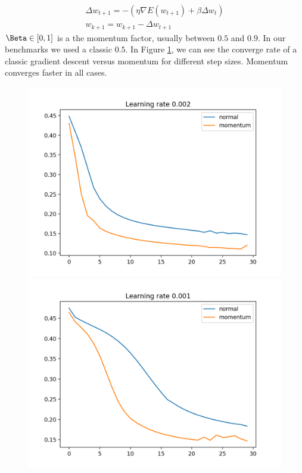 \documentclass[11pt]{article}
\begin{document}
\begin{equation}
	\label{eq: momentum}
	\begin{split}
	\Delta w_{ t + 1} = - (\eta \nabla E(w_{t + 1}) + \beta \Delta w_t) \\
	 w_{k + 1} = w_{k + 1} -   \Delta w_{ t + 1}
	 \end{split}
\end{equation}
$\Beta \in [0,1]$ is a the momentum factor, usually between $0.5$ and $0.9$. In our benchmarks we used a classic $0.5$. In Figure \ref{fig:momentum}, we can see the converge rate of a classic gradient descent versus momentum for different step sizes. Momentum converges faster in all cases.
\begin{figure}[H]
\label{fig:momentum}
\centering
\includegraphics[scale=0.35]{images/momentum_plot_0,002.png}	
\includegraphics[scale=0.35]{images/momentum_plot_0,001.png}	

\end{figure}
\end{document}
